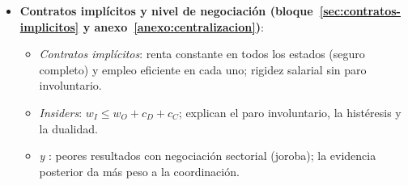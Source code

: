 \documentclass[11pt]{article}
\begin{document}
\begin{itemize}
\begin{itemize}
  \item \emph{ y }: $w=\overline{e}+\big(\rho+s/U\big)\,\overline{e}/q$; sube con $\overline{e}$, $\rho$ y $s$ y baja con $q$ y con el paro; sin paro no hay salario que disuada; con $s=0$, la CNE es horizontal; con $q\to\infty$, se llega al equilibrio walrasiano; una caída de la demanda mueve sobre todo el empleo.
  \end{itemize}
\item \textbf{Contratos implícitos y nivel de negociación (bloque~\ref{sec:contratos-implicitos} y anexo~\ref{anexo:centralizacion})}:
  \begin{itemize}
  \item \emph{Contratos implícitos}: renta constante en todos los estados (seguro completo) y empleo eficiente en cada uno; rigidez salarial sin paro involuntario.
  \item \emph{Insiders}: $w_I\leq w_O+c_D+c_C$; explican el paro involuntario, la histéresis y la dualidad.
  \item \emph{ y }: peores resultados con negociación sectorial (joroba); la evidencia posterior da más peso a la coordinación.
  \end{itemize}
\end{itemize}

\nocite{MartinezMatute2018Determinacion,Sahuquillo2017Determinacion,Matthews1990Marshall,OIT2013Resolucion}
\bibliografia
\end{document}
